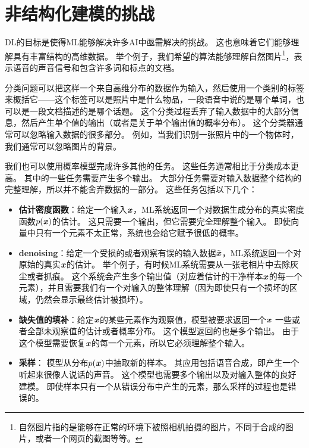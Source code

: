 \section{非结构化建模的挑战}
\label{sec:the_challenge_of_unstructured_modelling}


\gls{DL}的目标是使得\gls{ML}能够解决许多\gls{AI}中亟需解决的挑战。
这也意味着它们能够理解具有丰富结构的高维数据。
举个例子，我们希望的算法能够理解自然图片\footnote{自然图片指的是能够在正常的环境下被照相机拍摄的图片，不同于合成的图片，或者一个网页的截图等等。}，表示语音的声音信号和包含许多词和标点的文档。


分类问题可以把这样一个来自高维分布的数据作为输入，然后使用一个类别的标签来概括它——这个标签可以是照片中是什么物品，一段语音中说的是哪个单词，也可以是一段文档描述的是哪个话题。
这个分类过程丢弃了输入数据中的大部分信息，然后产生单个值的输出（或者是关于单个输出值的概率分布）。
这个分类器通常可以忽略输入数据的很多部分。
例如，当我们识别一张照片中的一个物体时，我们通常可以忽略图片的背景。


我们也可以使用概率模型完成许多其他的任务。
这些任务通常相比于分类成本更高。
其中的一些任务需要产生多个输出。
大部分任务需要对输入数据整个结构的完整理解，所以并不能舍弃数据的一部分。
这些任务包括以下几个：
\begin{itemize}
\item \textbf{估计密度函数}：给定一个输入$\boldsymbol{\mathit{x}}$，\gls{ML}系统返回一个对数据生成分布的真实密度函数$p(\boldsymbol{\mathit{x}})$的估计。
这只需要一个输出，但它需要完全理解整个输入。
即使向量中只有一个元素不太正常，系统也会给它赋予很低的概率。
	
	
\item
\textbf{\gls{denoising}}：给定一个受损的或者观察有误的输入数据$\tilde{\boldsymbol{\mathit{x}}}$，\gls{ML}系统返回一个对原始的真实$\boldsymbol{\mathit{x}}$的估计。
举个例子，有时候\gls{ML}系统需要从一张老相片中去除灰尘或者抓痕。
这个系统会产生多个输出值（对应着估计的干净样本$\boldsymbol{\mathit{x}}$的每一个元素），并且需要我们有一个对输入的整体理解（因为即使只有一个损坏的区域，仍然会显示最终估计被损坏）。%
	
\item
\textbf{缺失值的填补}：给定$\boldsymbol{\mathit{x}}$的某些元素作为观察值，模型被要求返回一个$\boldsymbol{\mathit{x}}$
一些或者全部未观察值的估计或者概率分布。
这个模型返回的也是多个输出。
由于这个模型需要恢复$\boldsymbol{\mathit{x}}$的每一个元素，所以它必须理解整个输入。
	
	
\item \textbf{采样}： 模型从分布$p(\boldsymbol{\mathit{x}})$中抽取新的样本。
其应用包括语音合成，即产生一个听起来很像人说话的声音。
这个模型也需要多个输出以及对输入整体的良好建模。
即使样本只有一个从错误分布中产生的元素，那么采样的过程也是错误的。 
\end{itemize}

